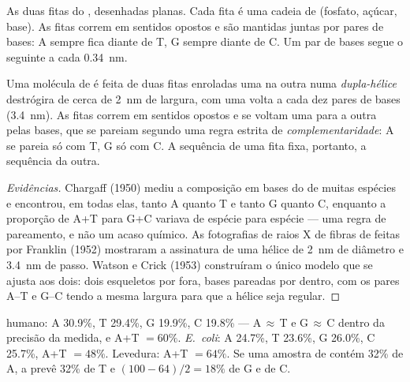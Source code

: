 \begin{omfigure}
{\small As duas fitas do , desenhadas planas. Cada fita é uma cadeia
de  (fosfato, açúcar, base). As fitas correm em sentidos
opostos e são mantidas juntas por pares de bases: A sempre fica diante
de T, G sempre diante de C. Um par de bases segue o seguinte a cada
\qty{0.34}{nm}.}
\end{omfigure}

\begin{proposition}\label{prop:g10:universal-dna:helix}
Uma molécula de  é feita de duas fitas enroladas uma na outra numa
\emph{dupla-hélice} destrógira de cerca de
\qty{2}{nm} de largura, com uma volta a cada dez pares de bases
(\qty{3.4}{nm}). As fitas correm em sentidos opostos e se voltam uma
para a outra pelas bases, que se pareiam segundo uma regra estrita de
\emph{complementaridade}: A se pareia só com
T, G só com C. A sequência de uma fita fixa, portanto, a sequência da
outra.
\end{proposition}
\begin{proof}[Evidências]
Chargaff (1950) mediu a composição em bases do  de muitas espécies e
encontrou, em todas elas, tanto A quanto T e tanto G quanto C,
enquanto a proporção de A+T para G+C variava de espécie para espécie
--- uma regra de pareamento, e não um acaso químico. As fotografias de
raios X de fibras de  feitas por Franklin (1952) mostraram a
assinatura de uma hélice de \qty{2}{nm} de diâmetro e \qty{3.4}{nm} de
passo. Watson e Crick (1953) construíram o único modelo que se ajusta
aos dois: dois esqueletos por fora, bases pareadas por dentro, com os
pares A--T e G--C tendo a mesma largura para que a hélice seja regular.
\end{proof}

\begin{example}\label{ex:g10:universal-dna:chargaff}
 humano: A 30.9\%, T 29.4\%, G 19.9\%, C 19.8\% --- A$\,\approx\,$T
e G$\,\approx\,$C dentro da precisão da medida, e A+T $= 60\%$.
\emph{E.~coli}: A 24.7\%, T 23.6\%, G 26.0\%, C 25.7\%, A+T $= 48\%$.
Levedura: A+T $= 64\%$. Se uma amostra de  contém 32\% de A, a
 prevê 32\% de T e $(100 - 64)/2 = 18\%$ de G e de C.
\end{example}


